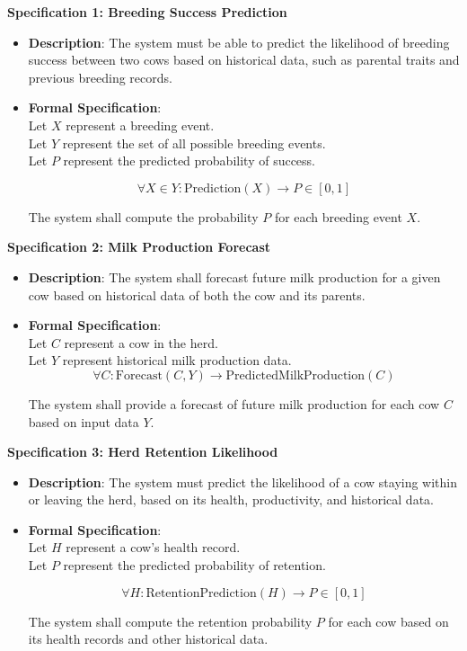 \documentclass[12pt]{article}
\begin{document}
\textbf{Specification 1: Breeding Success Prediction}
\begin{itemize}
    \item \textbf{Description}: The system must be able to predict the likelihood 
    of breeding success between two cows based on historical data, such as 
    parental traits and previous breeding records.
    \item \textbf{Formal Specification}: \\
    Let \( X \) represent a breeding event. \\
    Let \( Y \) represent the set of all possible breeding events. \\
    Let \( P \) represent the predicted probability of success.
    
    \[
    \forall X \in Y : \textrm{Prediction}(X) \rightarrow P \in [0, 1]
    \]
    
    The system shall compute the probability \( P \) for each breeding event \( X \).
\end{itemize}

\textbf{Specification 2: Milk Production Forecast}
\begin{itemize}
    \item \textbf{Description}: The system shall forecast future milk production 
    for a given cow based on historical data of both the cow and its parents.
    \item \textbf{Formal Specification}: \\
    Let \( C \) represent a cow in the herd. \\
    Let \( Y \) represent historical milk production data. \\
    
    \[
    \forall C : \textrm{Forecast}(C, Y) \rightarrow \textrm{PredictedMilkProduction}(C)
    \]
    
    The system shall provide a forecast of future milk production for each 
    cow \( C \) based on input data \( Y \).
\end{itemize}

\textbf{Specification 3: Herd Retention Likelihood}
\begin{itemize}
    \item \textbf{Description}: The system must predict the likelihood of a cow 
    staying within or leaving the herd, based on its health, productivity, 
    and historical data.
    \item \textbf{Formal Specification}: \\
    Let \( H \) represent a cow's health record. \\
    Let \( P \) represent the predicted probability of retention.
    
    \[
    \forall H : \textrm{RetentionPrediction}(H) \rightarrow P \in [0, 1]
    \]
    
    The system shall compute the retention probability \( P \) for each cow 
    based on its health records and other historical data.
\end{itemize}
\end{document}
